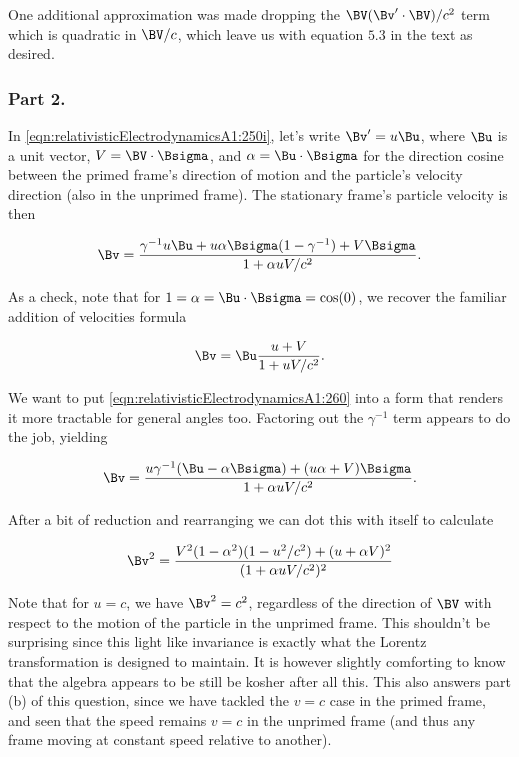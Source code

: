 One additional approximation was made dropping the $\BV (\Bv' \cdot \BV)/c^2$ term which is quadratic in $\BV/c$, which leave us with equation $5.3$ in the text as desired.

\subsubsection{Part 2.}

In \ref{eqn:relativisticElectrodynamicsA1:250i}, let's write $\Bv' = u \Bu$, where $\Bu$ is a unit vector, $V = \BV \cdot \Bsigma$, and $\alpha = \Bu \cdot \Bsigma$ for the direction cosine between the primed frame's direction of motion and the particle's velocity direction (also in the unprimed frame).  The stationary frame's particle velocity is then

\begin{equation}\label{eqn:relativisticElectrodynamicsA1:260}
\Bv = \frac{\gamma^{-1} u \Bu + u \alpha \Bsigma (1 - \gamma^{-1}) + V \Bsigma}{ 1 + \alpha u V/c^2 }.
\end{equation}

As a check, note that for $1 = \alpha = \Bu \cdot \Bsigma = \cos(0)$, we recover the familiar addition of velocities formula 

\begin{equation}\label{eqn:relativisticElectrodynamicsA1:260b}
\Bv = \Bu \frac{u + V}{ 1 + u V/c^2 }.
\end{equation}

We want to put \ref{eqn:relativisticElectrodynamicsA1:260} into a form that renders it more tractable for general angles too.  Factoring out the $\gamma^{-1}$ term appears to do the job, yielding

\begin{equation}\label{eqn:relativisticElectrodynamicsA1:260c}
\Bv = \frac{u \gamma^{-1} (\Bu -\alpha \Bsigma) + (u \alpha + V) \Bsigma}{ 1 + \alpha u V/c^2 }.
\end{equation}

After a bit of reduction and rearranging we can dot this with itself to calculate

\begin{equation}\label{eqn:relativisticElectrodynamicsA1:270}
\Bv^2 = \frac{V^2(1 - \alpha^2)(1 - u^2/c^2) + (u + \alpha V)^2}{ (1 + \alpha u V/c^2)^2 }
\end{equation}

Note that for $u = c$, we have $\Bv^2 = c^2$, regardless of the direction of $\BV$ with respect to the motion of the particle in the unprimed frame.  This shouldn't be surprising since this light like invariance is exactly what the Lorentz transformation is designed to maintain.  It is however slightly comforting to know that the algebra appears to be still be kosher after all this.  This also answers part (b) of this question, since we have tackled the $v = c$ case in the primed frame, and seen that the speed remains $v = c$ in the unprimed frame (and thus any frame moving at constant speed relative to another).

